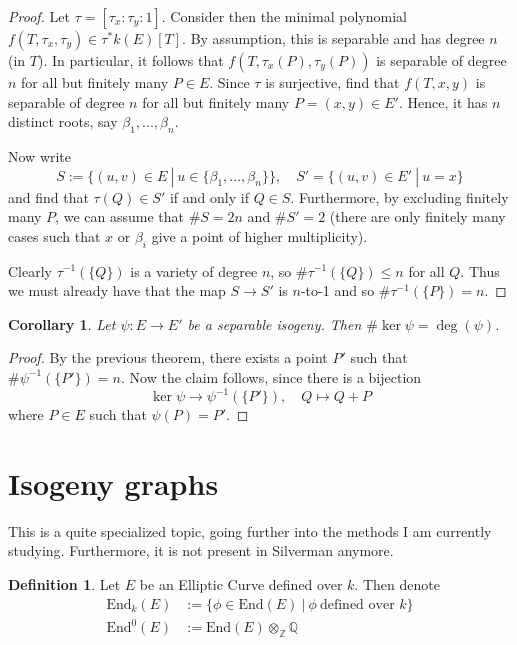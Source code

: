 \documentclass{scrartcl}
\newcommand{\Z}{\mathbb{Z}}
\newcommand{\End}{\mathrm{End}}
\newtheorem{corollary}[prop]{Corollary}
\theoremstyle{definition}
\newtheorem{definition}[prop]{Definition}
\begin{document}
\begin{proof}
    Let $\tau = [\tau_x : \tau_y : 1]$.
    Consider then the minimal polynomial $f(T, \tau_x, \tau_y) \in \tau^*k(E)[T]$.
    By assumption, this is separable and has degree $n$ (in $T$).
    In particular, it follows that $f(T, \tau_x(P), \tau_y(P))$ is separable of degree $n$ for all but finitely many $P \in E$.
    Since $\tau$ is surjective, find that $f(T, x, y)$ is separable of degree $n$ for all but finitely many $P = (x, y) \in E'$.
    Hence, it has $n$ distinct roots, say $\beta_1, ..., \beta_n$.

    Now write
    \begin{equation*}
        S := \bigl\{ (u, v) \in E \ | \ u \in \{ \beta_1, ..., \beta_n \} \bigr\}, \quad S' = \bigl\{ (u, v) \in E' \ | \ u = x \bigr\}
    \end{equation*}
    and find that $\tau(Q) \in S'$ if and only if $Q \in S$.
    Furthermore, by excluding finitely many $P$, we can assume that $\#S = 2n$ and $\#S' = 2$ (there are only finitely many cases such that $x$ or $\beta_i$ give a point of higher multiplicity).

    Clearly $\tau^{-1}(\{Q\})$ is a variety of degree $n$, so $\#\tau^{-1}(\{Q\}) \leq n$ for all $Q$.
    Thus we must already have that the map $S \to S'$ is $n$-to-1 and so $\#\tau^{-1}(\{P\}) = n$.
\end{proof}
\begin{corollary}
    \label{prop:deg_separable_isogeny}
    Let $\psi: E \to E'$ be a separable isogeny.
    Then $\#\ker\psi = \deg(\psi)$. 
\end{corollary}
\begin{proof}
    By the previous theorem, there exists a point $P'$ such that $\#\psi^{-1}(\{P'\}) = n$.
    Now the claim follows, since there is a bijection
    \begin{equation*}
        \ker\psi \to \psi^{-1}(\{P'\}), \quad Q \mapsto Q + P
    \end{equation*}
    where $P \in E$ such that $\psi(P) = P'$.
\end{proof}

\section{Isogeny graphs}
This is a quite specialized topic, going further into the methods I am currently studying.
Furthermore, it is not present in Silverman anymore.

\begin{definition}
    Let $E$ be an Elliptic Curve defined over $k$.
    Then denote
    \begin{align*}
        \End_k(E) &:= \{ \phi \in \End(E) \ | \ \phi \ \text{defined over $k$} \} \\
        \End^0(E) &:= \End(E) \otimes_{\Z} {\mathbb{Q}}
    \end{align*}
\end{definition}
\end{document}
